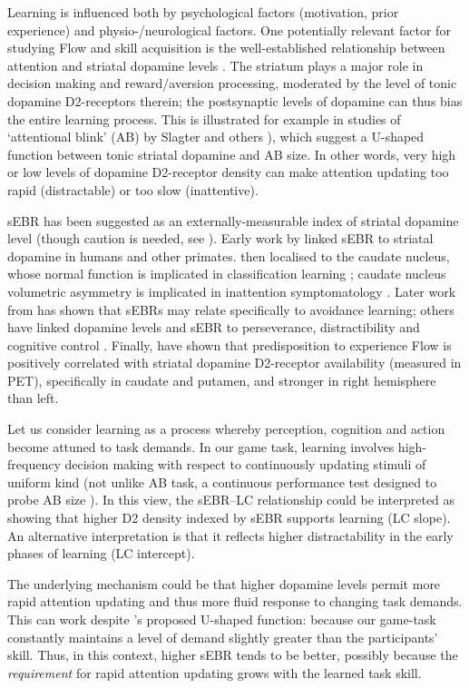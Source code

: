 \documentclass[10pt,letterpaper,floatsintext]{article}
\begin{document}
Learning is influenced both by psychological factors (motivation, prior experience) and physio-/neurological factors. One potentially relevant factor for studying Flow and skill acquisition is the well-established relationship between attention and striatal dopamine levels \cite{Dreisbach2005}. The striatum plays a major role in decision making and reward/aversion processing, moderated by the level of tonic dopamine D2-receptors therein; the postsynaptic levels of dopamine can thus bias the entire learning process. This is illustrated for example in studies of `attentional blink' (AB) by Slagter and others \cite{Slagter2012,COLZATO2008}), which suggest a U-shaped function between tonic striatal dopamine and AB size. In other words, very high or low levels of dopamine D2-receptor density can make attention updating too rapid (distractable) or too slow (inattentive).

sEBR has been suggested as an externally-measurable index of striatal dopamine level (though caution is needed, see \cite{dang2017spontaneous}). Early work by \cite{Karson1983} linked sEBR to striatal dopamine in humans and other primates. \cite{Taylor1999} then localised to the caudate nucleus, whose normal function is implicated in classification learning \cite{Seger2005}; caudate nucleus volumetric asymmetry is implicated in inattention symptomatology \cite{Schrimsher2002}. Later work from \cite{Slagter2015} has shown that sEBRs may relate specifically to avoidance learning; others have linked dopamine levels and sEBR to perseverance, distractibility and cognitive control \cite{Muller2007,Dreisbach2005}. Finally, \cite{DeManzano2013} have shown that  predisposition to experience Flow is positively correlated with striatal dopamine D2-receptor availability (measured in PET), specifically in caudate and putamen, and stronger in right hemisphere than left.

Let us consider learning as a process whereby perception, cognition and action become attuned to task demands. In our game task, learning involves high-frequency decision making with respect to continuously updating stimuli of uniform kind (not unlike AB task, a continuous performance test designed to probe AB size \cite{Slagter2012}). In this view, the sEBR--LC relationship could be interpreted as showing that higher D2 density indexed by sEBR supports learning (LC slope). An alternative interpretation is that it reflects higher distractability in the early phases of learning (LC intercept).

The underlying mechanism could be that higher dopamine levels permit more rapid attention updating and thus more fluid response to changing task demands. This can work despite \cite{Slagter2012}'s proposed U-shaped function: because our game-task constantly maintains a level of demand slightly greater than the participants' skill. Thus, in this context, higher sEBR tends to be better, possibly because the {\it requirement} for rapid attention updating grows with the learned task skill.
\end{document}
